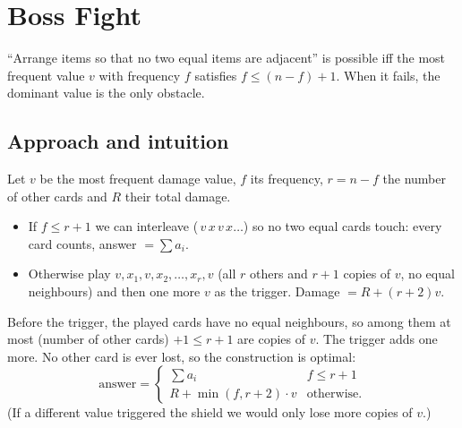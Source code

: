 \section{Boss Fight}
\label{sec:g-boss-fight}


\begin{patternbox}
``Arrange items so that no two equal items are adjacent'' is possible iff the
most frequent value $v$ with frequency $f$ satisfies $f\le (n-f)+1$. When it
fails, the dominant value is the only obstacle.
\end{patternbox}

\subsection*{Approach and intuition}

Let $v$ be the most frequent damage value, $f$ its frequency, $r=n-f$ the
number of other cards and $R$ their total damage.

\begin{itemize}
  \item If $f\le r+1$ we can interleave (\,$v\,x\,v\,x\dots$) so no two equal
        cards touch: every card counts, answer $=\sum a_i$.
  \item Otherwise play $v,x_1,v,x_2,\dots,x_r,v$ (all $r$ others and $r+1$
        copies of $v$, no equal neighbours) and then one more $v$ as the
        trigger. Damage $=R+(r+2)v$.
\end{itemize}

\begin{ideabox}
Before the trigger, the played cards have no equal neighbours, so among
them at most (number of other cards) $+1\le r+1$ are copies of $v$. The
trigger adds one more. No other card is ever lost, so the construction is
optimal:
\[
\text{answer}=\begin{cases}\sum a_i & f\le r+1\\ R+\min(f,r+2)\cdot v & \text{otherwise.}\end{cases}
\]
(If a different value triggered the shield we would only lose more copies
of $v$.)
\end{ideabox}

